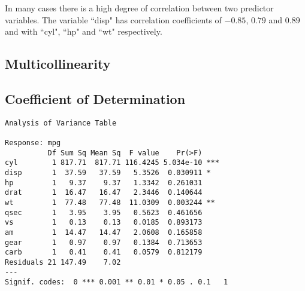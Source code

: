 In many cases there is a high degree of correlation between two predictor variables. The variable ``disp" has correlation coefficients of $-0.85$, $0.79$ and $0.89$ and with ``cyl", ``hp" and ``wt" respectively.

\subsection{Multicollinearity}



\subsection{Coefficient of Determination}

\footnotesize
\begin{verbatim}
Analysis of Variance Table

Response: mpg
          Df Sum Sq Mean Sq  F value    Pr(>F)
cyl        1 817.71  817.71 116.4245 5.034e-10 ***
disp       1  37.59   37.59   5.3526  0.030911 *
hp         1   9.37    9.37   1.3342  0.261031
drat       1  16.47   16.47   2.3446  0.140644
wt         1  77.48   77.48  11.0309  0.003244 **
qsec       1   3.95    3.95   0.5623  0.461656
vs         1   0.13    0.13   0.0185  0.893173
am         1  14.47   14.47   2.0608  0.165858
gear       1   0.97    0.97   0.1384  0.713653
carb       1   0.41    0.41   0.0579  0.812179
Residuals 21 147.49    7.02
---
Signif. codes:  0 *** 0.001 ** 0.01 * 0.05 . 0.1   1
\end{verbatim}\normalsize




